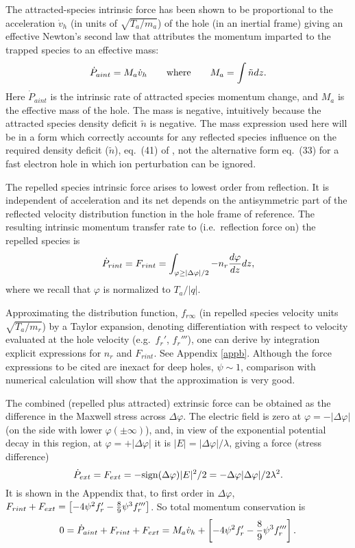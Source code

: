\documentclass[aip,pop,article-title]{revtex4-2}
\begin{document}
The attracted-species intrinsic force has been
shown\cite{Hutchinson2016} to be proportional to the acceleration
$\dot v_h$ (in units of $\sqrt{T_a/m_a}$) of the hole (in an inertial
frame) giving an effective Newton's second law that attributes the
momentum imparted to the trapped species to an effective mass:
\begin{equation}
  \label{Newtattr}
  \dot P_{aint} =M_a \dot v_h \qquad {\rm where} \qquad M_a=\int \tilde
  n dz.
\end{equation}
Here $\dot P_{aint}$ is the intrinsic rate of attracted species
momentum change, and $M_a$ is the effective mass of the hole. The mass
is negative, intuitively because the attracted species density deficit
$\tilde n$ is negative. The mass expression used here will be in a
form which correctly accounts for any reflected species influence on
the required density deficit ($\tilde n$), eq.\ (41) of
\citet{Hutchinson2016}, not the alternative form eq.\ (33) for a fast
electron hole in which ion perturbation can be ignored.


The repelled species intrinsic force arises to lowest order from
reflection. It is independent of acceleration and its net depends on
the antisymmetric part of the reflected velocity distribution function
in the hole frame of reference.  The resulting intrinsic momentum
transfer rate to (i.e.\ reflection force on) the repelled species is
\begin{equation}
  \label{Newtrepel}
  \dot P_{rint}=F_{rint}=\int_{\varphi\ge|\Delta\varphi|/2}
- n_r {d\varphi\over dz} dz,
\end{equation}
where we recall that $\varphi$ is normalized to $T_a/|q|$.

Approximating the distribution function, $f_{r\infty}$ (in repelled
species velocity units $\sqrt{T_a/m_r}$) by a Taylor expansion,
denoting differentiation with respect to velocity evaluated at the
hole velocity (e.g.\ $f_r'$, $f_r'''$), one can derive by integration
explicit expressions for $n_r$ and $F_{rint}$. See Appendix
\ref{appb}. Although the force expressions to be cited are inexact for
deep holes, ${\psi}\sim 1$, comparison with numerical calculation will
show that the approximation is very good.


The combined (repelled plus attracted) extrinsic force can be obtained
as the difference in the Maxwell stress across $\Delta\varphi$. The
electric field is zero at $\varphi=-|\Delta\varphi|$ (on the side with
lower $\varphi(\pm\infty)$), and, in view of the exponential potential
decay in this region, at $\varphi=+|\Delta\varphi|$ it is
$|E|=|\Delta\varphi|/\lambda$, giving a force (stress difference)
\begin{equation}
\dot P_{ext}=F_{ext}=-{\rm
  sign}(\Delta\varphi)|E|^2/2=-\Delta\varphi|\Delta\varphi|/2\lambda^2.  
\end{equation}
It is shown in the Appendix that, to first order in $\Delta\varphi$,
$F_{rint}+F_{ext}=\left[-4{\psi}^2 f_r'-{8\over9}{\psi}^3
  f_r'''\right]$.
So total momentum conservation is
\begin{equation}
0=\dot P_{aint}+F_{rint}+F_{ext}=M_a \dot v_h+\left[-4{\psi}^2
  f_r'-{8\over9}{\psi}^3 f_r'''\right].
\end{equation}
\end{document}
